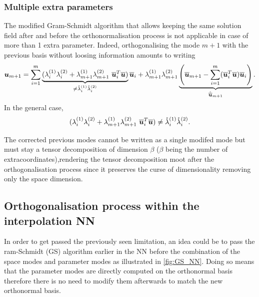 \subsubsection{Multiple extra parameters}

The modified Gram-Schmidt algorithm that allows keeping the same solution field after and before the orthonormalisation process is not applicable in case of more than 1 extra parameter. Indeed, orthogonalising the mode $m+1$ with the previous basis without loosing information amounts to writing 
	\begin{equation}\label{ortho}
		\boldsymbol{u}_{m+1} = \sum_{i=1}^{m} \underbrace{(\lambda_i^{(1)}\lambda_i^{(2)} + \lambda_{m+1}^{(1)}\lambda_{m+1}^{(2)} ~ \overline{\boldsymbol{u}}_i^T  \overline{\boldsymbol{u}})}_{\neq \mathring{\lambda}_i^{(1)}\mathring{\lambda}_i^{(2)}} \overline{\boldsymbol{u}}_i + \lambda_{m+1}^{(1)}\lambda_{m+1}^{(2)} \underbrace{\left(\overline{\boldsymbol{u}}_{m+1} - \sum_{i=1}^{m} ( \overline{\boldsymbol{u}}_i^T  \overline{\boldsymbol{u}}) \overline{\boldsymbol{u}}_i\right)}_{\mathring{\overline{\boldsymbol{u}}}_{m+1}}.
	\end{equation}
In the general case, 
\begin{equation}
    (\lambda_i^{(1)}\lambda_i^{(2)} + \lambda_{m+1}^{(1)}\lambda_{m+1}^{(2)} ~ \overline{\boldsymbol{u}}_i^T  \overline{\boldsymbol{u}}) \neq \mathring{\lambda}_i^{(1)}\mathring{\lambda}_i^{(2)}.
\end{equation}

The corrected previous modes cannot be written as a single modifed mode but must stay a tensor decomposition of dimension $\beta$ ($\beta$ being the number of extracoordinates),rendering the tensor decomposition moot after the orthogonalisation process since it preserves the curse of dimensionality removing only the space dimension.

\subsection{Orthogonalisation process within the interpolation NN}

In order to get passed the previously seen limitation, an idea could be to pass the ram-Schmidt (GS) algorithm earlier in the NN before the combination of the space modes and parameter modes as illustrated in \cref{fig:GS_NN}. Doing so means that the parameter modes are directly computed on the orthonormal basis therefore there is no need to modify them afterwards to match the new orthonormal basis.

